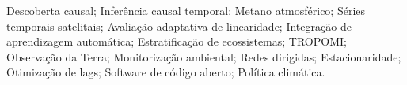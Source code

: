 \acresetall

\noindent Descoberta causal; Inferência causal temporal; Metano atmosférico; Séries temporais satelitais; Avaliação adaptativa de linearidade; Integração de aprendizagem automática; Estratificação de ecossistemas; TROPOMI; Observação da Terra; Monitorização ambiental; Redes dirigidas; Estacionaridade; Otimização de lags; Software de código aberto; Política climática.